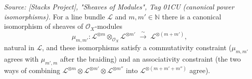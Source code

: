 \begin{lemma}\leanok
  \label{lem:sheafTensorPow_add}
  \textit{Source: [Stacks Project], "Sheaves of Modules", Tag 01CU (canonical
  power isomorphisms).}
  For a line bundle \(\mathcal{L}\) and \(m, m' \in \mathbb{N}\) there is a
  canonical isomorphism of sheaves of \(\mathcal{O}_X\)-modules
  \[
    \mu_{m,m'} :
    \mathcal{L}^{\otimes m} \otimes_{\mathcal{O}_X} \mathcal{L}^{\otimes m'}
    \;\xrightarrow{\ \sim\ }\; \mathcal{L}^{\otimes (m+m')},
  \]
  natural in \(\mathcal{L}\), and these isomorphisms satisfy a commutativity
  constraint (\(\mu_{m,m'}\) agrees with \(\mu_{m',m}\) after the braiding) and
  an associativity constraint (the two ways of combining
  \(\mathcal{L}^{\otimes m} \otimes \mathcal{L}^{\otimes m'} \otimes
  \mathcal{L}^{\otimes m''}\) into \(\mathcal{L}^{\otimes (m+m'+m'')}\) agree).
\end{lemma}

